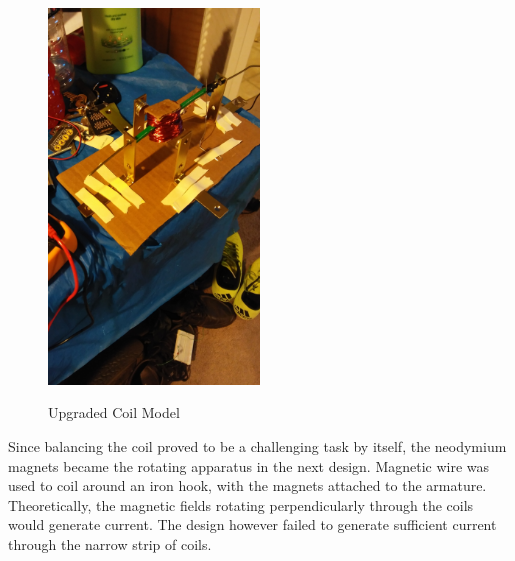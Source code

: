     \begin{figure}[ht]
        \begin{center}
            \includegraphics[width=0.5\textwidth]{figures/models/2.jpg}
            \label{fig:model2}
        \end{center} \caption{Upgraded Coil Model}
    \end{figure}

    \noindent
    Since balancing the coil proved to be a challenging task by itself, the neodymium magnets became the rotating apparatus in the next design. Magnetic wire was used to coil around an iron hook, with the magnets attached to the armature. Theoretically, the magnetic fields rotating perpendicularly through the coils would generate current. The design however failed to generate sufficient current through the narrow strip of coils.\\

